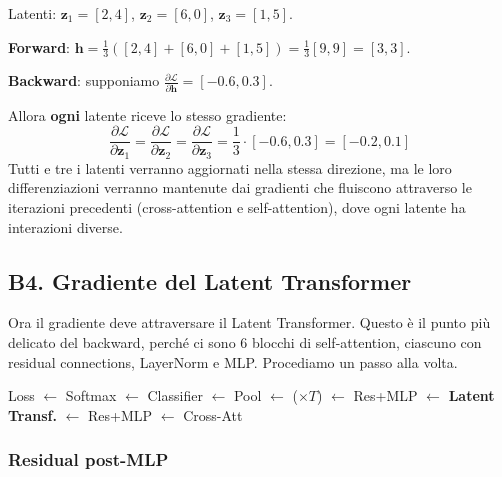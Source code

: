 \documentclass[12pt,a4paper]{article}
\begin{document}
\begin{examplebox}
Latenti: $\mathbf{z}_1 = [2, 4]$, $\mathbf{z}_2 = [6, 0]$, $\mathbf{z}_3 = [1, 5]$.

\textbf{Forward}: $\mathbf{h} = \frac{1}{3}([2,4] + [6,0] + [1,5]) = \frac{1}{3}[9, 9] = [3, 3]$.

\textbf{Backward}: supponiamo $\frac{\partial \mathcal{L}}{\partial \mathbf{h}} = [-0.6, 0.3]$.

Allora \textbf{ogni} latente riceve lo stesso gradiente:
\[
    \frac{\partial \mathcal{L}}{\partial \mathbf{z}_1} = \frac{\partial \mathcal{L}}{\partial \mathbf{z}_2} = \frac{\partial \mathcal{L}}{\partial \mathbf{z}_3} = \frac{1}{3} \cdot [-0.6, 0.3] = [-0.2, 0.1]
\]
Tutti e tre i latenti verranno aggiornati nella stessa direzione, ma le loro differenziazioni verranno mantenute dai gradienti che fluiscono attraverso le iterazioni precedenti (cross-attention e self-attention), dove ogni latente ha interazioni diverse.
\end{examplebox}


\subsection{B4. Gradiente del Latent Transformer} \label{sec:grad_latent}

Ora il gradiente deve attraversare il Latent Transformer. Questo \`e il punto pi\`u delicato del backward, perch\'e ci sono 6 blocchi di self-attention, ciascuno con residual connections, LayerNorm e MLP. Procediamo un passo alla volta.

\begin{pipelinebox}[title={\small Backward --- Passo corrente evidenziato}]
Loss $\leftarrow$ Softmax $\leftarrow$ Classifier $\leftarrow$ Pool $\leftarrow$ ($\times T$) $\leftarrow$ Res+MLP $\leftarrow$ \textbf{Latent Transf.} $\leftarrow$ Res+MLP $\leftarrow$ Cross-Att
\end{pipelinebox}

\subsubsection{Residual post-MLP}
\end{document}
